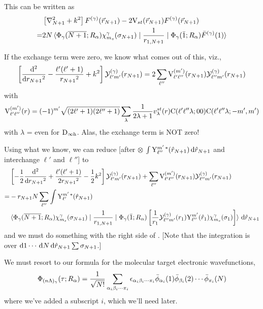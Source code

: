 \documentclass[aps,pra,groupedaddress,12pt,
               amsfonts,amssymb,
               preprint
    ]{revtex4}
\begin{document}
This can be written as
\begin{equation}
  \label{eq:esscb}
  \begin{split}
    &\left[\nabla^2_{N+1}+k^2\right]F^{(\gamma)}(\vec{r}_{N+1})-2\mathrm{V}_{st}(\vec{r}_{N+1})F^{(\gamma)}(\vec{r}_{N+1}) \\
    =&2N\mathinner{\langle{{\Phi_\gamma(\overline{N+1};R_\alpha)\chi_{m_s}^{\gamma}(\sigma_{N+1})} \mid {\dfrac{1}{r_{1,N+1}}} \mid {\Phi_\gamma(\bar{1};R_\alpha)\bar{F}^{(\gamma)}(1)}}\rangle}
  \end{split}
\end{equation}

If the exchange term were zero, we know what comes out of this, viz.,
\begin{equation}
  \label{eq:esscc}
  \left[\dfrac{\mathrm{d}^2}{\mathrm{d}
      r_{N+1}{}^2}-\dfrac{\ell'(\ell'+1)}{r_{N+1}{}^2}+k^2\right]\mathcal{Y}_{\ell'm'}^{(\gamma)}(r_{N+1})
=2\sum_{\ell''}\mathrm{V}_{\ell'\ell''}^{(m')}(r_{N+1})\mathcal{Y}_{\ell''m'}^{(\gamma)}(r_{N+1})
\end{equation}
with
\begin{equation}
  \label{eq:mvst}
  \mathrm{V}_{\ell'\ell''}^{(m')}(r) = (-1)^{m'}\sqrt{(2\ell'+1)(2\ell''+1)}
                        \sum_{\lambda}\dfrac{1}{2\lambda+1}v_\lambda^{st}(r)
                        \mathrm{C}(\ell'\ell''\lambda;00)\mathrm{C}(\ell'\ell''\lambda;-m',m')
\end{equation}
with $\lambda$ = even for $\mathrm{D}_{\infty\text{h}}$. Alas, the exchange term is NOT zero!

Using what we know, we can reduce  [after $\otimes$
$\int\mathrm{Y}_{\ell''}^{m'\,*}(\hat{r}_{N+1})\,\mathrm{d}\hat{r}_{N+1}$ and interchange $\ell'$ and $\ell''$] to
\begin{equation}
  \label{eq:esscd}
    \begin{split}
    &\left[-\dfrac{1}{2}\dfrac{\mathrm{d}^2}{\mathrm{d}
        r_{N+1}{}^2}+\dfrac{\ell'(\ell'+1)}{2r_{N+1}{}^2}-\dfrac{1}{2}k^2\right]\mathcal{Y}_{\ell'm'}^{(\gamma)}(r_{N+1}) 
      + \sum_{\ell''}\mathrm{V}_{\ell'\ell''}^{(m')}(r_{N+1})\mathcal{Y}_{\ell''m'}^{(\gamma)}(r_{N+1}) \\
   = &-r_{N+1}N\sum_{\ell''}\int\mathrm{Y}_{\ell'}^{m'\,*}(\hat{r}_{N+1}) \\
     & \mathinner{\langle{{\Phi_\gamma(\overline{N+1};R_\alpha)\chi_{m_s}^{\gamma}(\sigma_{N+1})} \mid {\dfrac{1}{r_{1,N+1}}} \mid {\Phi_\gamma(\bar{1};R_\alpha)\left[\dfrac{1}{r_1}\mathcal{Y}_{\ell''m'}^{(\gamma)}(r_1)\mathrm{Y}_{\ell''}^{m'}(\hat{r}_1)\chi_{m_s}^{\gamma}(\sigma_1)\right]}}\rangle}\,\mathrm{d}\hat{r}_{N+1}
  \end{split}
\end{equation}
and we must do something with the right side of . [Note that
the integration is over $\mathrm{d} 1\cdots\,\mathrm{d} N\,\mathrm{d}\hat{r}_{N+1}\sum\sigma_{N+1}$.]

We must resort to our formula  for the molecular target
electronic wavefunctions,
\begin{equation}
  \label{eq:ewi}
  \Phi_{(n\Lambda)_\gamma}(\tau;R_\alpha)=\dfrac{1}{\sqrt{N!}}
  \sum_{{\alpha_i\beta_i\cdots\pi_i}}\epsilon_{{\alpha_i\beta_i\cdots\pi_i}}\bar{\phi}_{\alpha_i}(1)\bar{\phi}_{\beta_i}(2)\cdots\bar{\phi}_{\pi_i}(N)
\end{equation}
where we've added a subscript $i$, which we'll need later.
\end{document}
